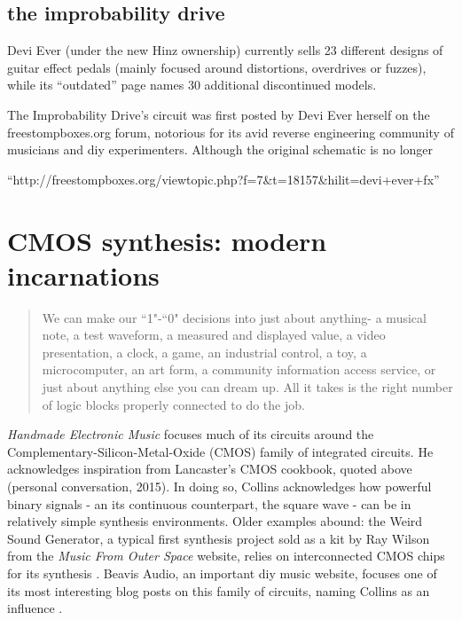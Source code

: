 \subsection{the improbability drive}

Devi Ever (under the new Hinz ownership) currently sells 23 different designs of guitar effect pedals (mainly focused around distortions, overdrives or fuzzes), while its ``outdated'' page names 30 additional discontinued models. 

The Improbability Drive's circuit was first posted by Devi Ever herself on the freestompboxes.org forum, notorious for its avid reverse engineering community of musicians and diy experimenters. Although the original schematic is no longer

``http://freestompboxes.org/viewtopic.php?f=7&t=18157&hilit=devi+ever+fx''

\section{CMOS synthesis: modern incarnations}

\begin{quote}
	
	We can make our ``1"-``0" decisions into just about anything- a musical note, a test waveform, a measured and displayed value, a video presentation, a clock, a game, an industrial control, a toy, a microcomputer, an art form, a community information access service, or just about anything else you can dream up. All it takes is the right number of logic blocks properly connected to do the job.
	\citep[pp-7-8]{lancaster1988}
	
\end{quote}

\emph{Handmade Electronic Music} focuses much of its circuits around the Complementary-Silicon-Metal-Oxide (CMOS) family of integrated circuits. He acknowledges inspiration from Lancaster's CMOS cookbook, quoted above (personal conversation, 2015). In doing so, Collins acknowledges how powerful binary signals - an its continuous counterpart, the square wave - can be in relatively simple synthesis environments. Older examples abound: the Weird Sound Generator, a typical first synthesis project sold as a kit by Ray Wilson from the \emph{Music From Outer Space} website, relies on interconnected CMOS chips for its synthesis \citep{wilson2015}. Beavis Audio, an important diy music website, focuses one of its most interesting blog posts on this family of circuits, naming Collins as an influence \citep{beavis2015}. 

